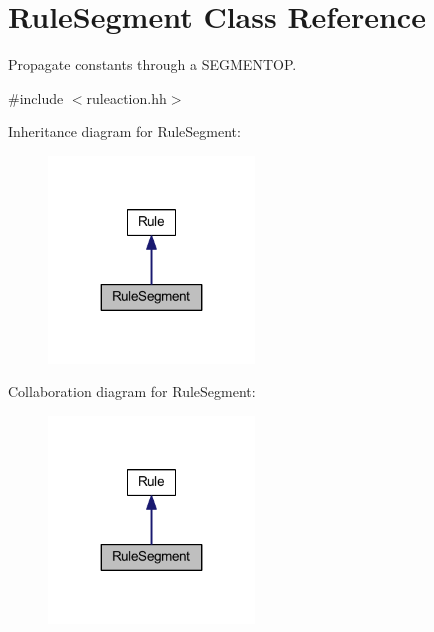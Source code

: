 \hypertarget{class_rule_segment}{}\section{Rule\+Segment Class Reference}
\label{class_rule_segment}


Propagate constants through a S\+E\+G\+M\+E\+N\+T\+OP.  




{\ttfamily \#include $<$ruleaction.\+hh$>$}



Inheritance diagram for Rule\+Segment\+:
\nopagebreak
\begin{figure}[H]
\begin{center}
\leavevmode
\includegraphics[width=155pt]{class_rule_segment__inherit__graph}
\end{center}
\end{figure}


Collaboration diagram for Rule\+Segment\+:
\nopagebreak
\begin{figure}[H]
\begin{center}
\leavevmode
\includegraphics[width=155pt]{class_rule_segment__coll__graph}
\end{center}
\end{figure}
